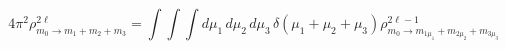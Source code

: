 \begin{equation}
 4\pi^2\rho^{2\ell}_{m_0\rightarrow m_1+m_2+m_3}=\int\!\!\!\int\!\!\!\int\!  
 d\mu_1\,d\mu_2\,d\mu_3\,\delta(\mu_1+\mu_2+\mu_3)
 \rho^{2\ell-1}_{m_0\rightarrow m_{1\mu_1}+m_{2\mu_2}+m_{3\mu_3}}
\end{equation}

